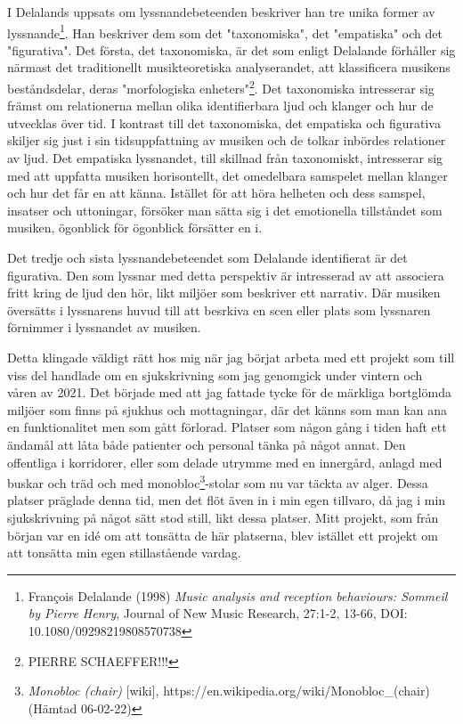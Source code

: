 \documentclass{article}
\begin{document}
I Delalands uppsats om lyssnandebeteenden beskriver han tre unika former av lyssnande\footnote{François
Delalande (1998) \emph{Music analysis and reception behaviours: Sommeil by Pierre Henry}, Journal of New Music
Research, 27:1-2, 13-66, DOI: 10.1080/09298219808570738}. Han beskriver dem som det "taxonomiska", det
"empatiska" och det "figurativa". Det första, det taxonomiska, är det som enligt Delalande förhåller sig
närmast det traditionellt musikteoretiska analyserandet, att klassificera musikens beståndsdelar, deras
"morfologiska enheters"\footnote{PIERRE SCHAEFFER!!!}. Det taxonomiska intresserar sig främst om relationerna
mellan olika identifierbara ljud och klanger och hur de utvecklas över tid. I kontrast till det taxonomiska,
det empatiska och figurativa skiljer sig just i sin tidsuppfattning av musiken och de tolkar inbördes
relationer av ljud. Det empatiska lyssnandet, till skillnad från taxonomiskt, intresserar sig med att
uppfatta musiken horisontellt, det omedelbara samspelet mellan klanger och hur det får en att känna. Istället
för att höra helheten och dess samspel, insatser och uttoningar, försöker man sätta sig i det emotionella
tillståndet som musiken, ögonblick för ögonblick försätter en i. 


Det tredje och sista lyssnandebeteendet som Delalande identifierat är det figurativa. Den som lyssnar med
detta perspektiv är intresserad av att associera fritt kring de ljud den hör, likt miljöer som beskriver ett
narrativ. Där musiken översätts i lyssnarens huvud till att besrkiva en scen eller plats som lyssnaren
förnimmer i lyssnandet av musiken.

Detta klingade väldigt rätt hos mig när jag börjat arbeta med ett projekt som till viss del handlade om en
sjukskrivning som jag genomgick under vintern och våren av 2021. Det började med att jag fattade tycke för de
märkliga bortglömda miljöer som finns på sjukhus och mottagningar, där det känns som man kan ana en
funktionalitet men som gått förlorad. Platser som någon gång i tiden haft ett ändamål att låta både patienter
och personal tänka på något annat. Den offentliga i korridorer, eller som delade utrymme med
en innergård, anlagd med buskar och träd och med monobloc\footnote{\emph{Monobloc
(chair)} [wiki], https://en.wikipedia.org/wiki/Monobloc\_(chair) (Hämtad 06-02-22)}-stolar som nu var täckta av
alger. Dessa platser präglade denna tid, men det flöt även in i min egen tillvaro, då jag i min sjukskrivning
på något sätt stod still, likt dessa platser. Mitt projekt, som från början var en idé om att tonsätta de här
platserna, blev istället ett projekt om att tonsätta min egen stillastående vardag. 
\end{document}
